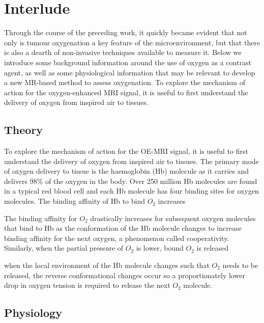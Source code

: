 
\chapter{Interlude}
\label{ch:interlude}
Through the course of the preceding work, it quickly became evident that not only is tumour oxygenation a key feature of the microenvironment, but that there is also a dearth of non-invasive techniques available to measure it.
Below we introduce some background information around the use of oxygen as a contrast agent, as well as some physiological information that may be relevant to develop a new MR-based method to assess oxygenation.
To explore the mechanism of action for the oxygen-enhanced MRI signal, it is useful to first understand the delivery of oxygen from inspired air to tissues.

\section{Theory}
To explore the mechanism of action for the OE-MRI signal, it is useful to first understand the delivery of oxygen from inspired air to tissues. 
The primary mode of oxygen delivery to tissue is the haemoglobin (\acs{Hb}) molecule as it carries and delivers 98\% of the oxygen in the body. 
Over 250 million \acs{Hb} molecules are found in a typical red blood cell and each \acs{Hb} molecule has four binding sites for oxygen molecules. 
The binding affinity of \acs{Hb} to bind ${O_2}$ increases 

The binding affinity for ${O_2}$ drastically increases for subsequent oxygen molecules that bind to \acs{Hb} as the conformation of the \acs{Hb} molecule changes to increase binding affinity for the next oxygen, a phenomenon called cooperativity. 
Similarly, when the partial pressure of ${O_2}$ is lower, bound ${O_2}$ is released 

when the local environment of the \acs{Hb} molecule changes such that ${O_2}$ needs to be released, the reverse conformational changes occur so a proportionately lower drop in oxygen tension is required to release the next ${O_2}$ molecule. 

\section{Physiology}

